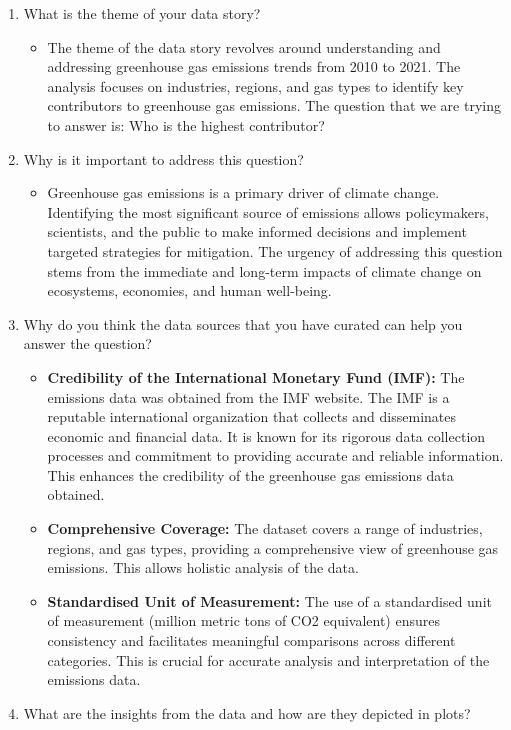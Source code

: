 \documentclass[
]{article}
\providecommand{\tightlist}{%
  \setlength{\itemsep}{0pt}\setlength{\parskip}{0pt}}
\begin{document}
\begin{enumerate}
\def\labelenumi{\arabic{enumi}.}
\item
  What is the theme of your data story?

  \begin{itemize}
  \tightlist
  \item
    The theme of the data story revolves around understanding and
    addressing greenhouse gas emissions trends from 2010 to 2021. The
    analysis focuses on industries, regions, and gas types to identify
    key contributors to greenhouse gas emissions. The question that we
    are trying to answer is: Who is the highest contributor?
  \end{itemize}
\item
  Why is it important to address this question?

  \begin{itemize}
  \tightlist
  \item
    Greenhouse gas emissions is a primary driver of climate change.
    Identifying the most significant source of emissions allows
    policymakers, scientists, and the public to make informed decisions
    and implement targeted strategies for mitigation. The urgency of
    addressing this question stems from the immediate and long-term
    impacts of climate change on ecosystems, economies, and human
    well-being.
  \end{itemize}
\item
  Why do you think the data sources that you have curated can help you
  answer the question?

  \begin{itemize}
  \item
    \textbf{Credibility of the International Monetary Fund (IMF):} The
    emissions data was obtained from the IMF website. The IMF is a
    reputable international organization that collects and disseminates
    economic and financial data. It is known for its rigorous data
    collection processes and commitment to providing accurate and
    reliable information. This enhances the credibility of the
    greenhouse gas emissions data obtained.
  \item
    \textbf{Comprehensive Coverage:} The dataset covers a range of
    industries, regions, and gas types, providing a comprehensive view
    of greenhouse gas emissions. This allows holistic analysis of the
    data.
  \item
    \textbf{Standardised Unit of Measurement:} The use of a standardised
    unit of measurement (million metric tons of CO2 equivalent) ensures
    consistency and facilitates meaningful comparisons across different
    categories. This is crucial for accurate analysis and interpretation
    of the emissions data.
  \end{itemize}
\item
  What are the insights from the data and how are they depicted in
  plots?


\end{enumerate}
\end{document}
